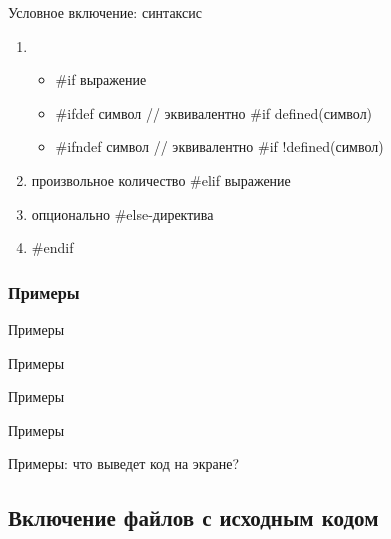     \begin{frame}{Условное включение: синтаксис}
        \begin{enumerate}
            \item
                \begin{itemize}
                    \item \#if выражение
                    \item \#ifdef символ // эквивалентно \#if defined(символ)
                    \item \#ifndef символ // эквивалентно \#if !defined(символ)
                \end{itemize}
            \item произвольное количество \#elif выражение
            \item опционально \#else-директива
            \item \#endif
        \end{enumerate}
    \end{frame}
    \subsubsection{Примеры}
    \begin{frame}{Примеры}
        
    \end{frame}
    \begin{frame}{Примеры}
        
    \end{frame}
    \begin{frame}{Примеры}
        
    \end{frame}
    \begin{frame}{Примеры}
        
    \end{frame}
    \begin{frame}{Примеры: что выведет код на экране?}
        
    \end{frame}
    \subsection{Включение файлов с исходным кодом}
